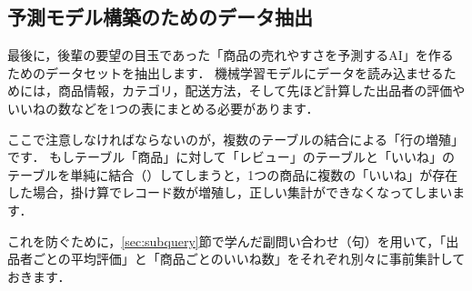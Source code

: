 \begin{table}[!htbp]
    \centering
    \caption{出品者ごとの平均評価スコアを算出するSQL文の問い合わせ結果}
    \label{tab:seller-evaluation-sql-results}
\end{table}


\subsection{予測モデル構築のためのデータ抽出}\label{sec:data-extraction}
最後に，後輩の要望の目玉であった「商品の売れやすさを予測するAI」を作るためのデータセットを抽出します．
機械学習モデルにデータを読み込ませるためには，商品情報，カテゴリ，配送方法，そして先ほど計算した出品者の評価やいいねの数などを1つの表にまとめる必要があります．

ここで注意しなければならないのが，複数のテーブルの結合による「行の増殖」です．
もしテーブル「商品」に対して「レビュー」のテーブルと「いいね」のテーブルを単純に結合（）してしまうと，1つの商品に複数の「いいね」が存在した場合，掛け算でレコード数が増殖し，正しい集計ができなくなってしまいます．

これを防ぐために，\ref{sec:subquery}節で学んだ副問い合わせ（句）を用いて，「出品者ごとの平均評価」と「商品ごとのいいね数」をそれぞれ別々に事前集計しておきます．

